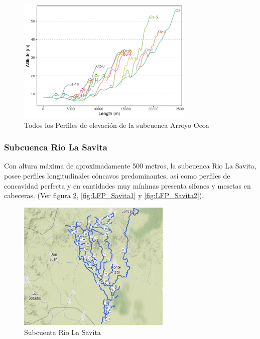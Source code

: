 \documentclass[11pt,]{article}
\begin{document}
\begin{figure}
\centering
\includegraphics[width=0.75000\textwidth]{Productos Generados/p_c_ocoa.png}
\caption{\label{fig:LFP_ocoa2} Todos los Perfiles de elevación de la
subcuenca Arroyo Ocoa}
\end{figure}

\subsubsection{Subcuenca Rio La Savita}\label{subcuenca-rio-la-savita}

Con altura máxima de aproximadamente 500 metros, la subcuenca Rio La
Savita, posee perfiles longitudinales cóncavos predominantes, así como
perfiles de concavidad perfecta y en cantidades muy mínimas presenta
sifones y mesetas en cabeceras. (Ver figura \ref{fig:LFP_Savita0},
\ref{fig:LFP_Savita1} y \ref{fig:LFP_Savita2}).

\begin{figure}
\centering
\includegraphics[width=0.65000\textwidth]{Productos Generados/p_Savita.png}
\caption{\label{fig:LFP_Savita0} Subcuenta Rio La Savita}
\end{figure}
\end{document}
